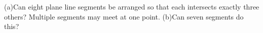 (a)Can eight plane line segments be arranged so that each intersects exactly three others? Multiple segments may meet at one point. (b)Can seven segments do this?
